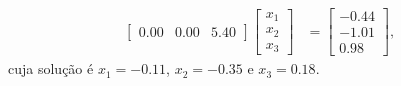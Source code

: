 \begin{questions}
\begin{solution}
\begin{align*}
\begin{bmatrix}
                0.00 & 0.00 & 5.40
            \end{bmatrix} \begin{bmatrix}
                x_1 \\
                x_2 \\
                x_3
            \end{bmatrix} &= \begin{bmatrix}
                -0.44 \\
                -1.01 \\
                0.98
            \end{bmatrix},
        \end{align*}
        cuja solu\c{c}\~{a}o \'{e} $x_1 = -0.11$, $x_2 = -0.35$ e $x_3 = 0.18$.
    \end{solution}

    \question
    \begin{parts}

\end{parts}
\end{questions}
